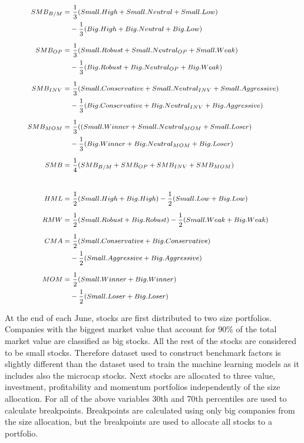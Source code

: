 \documentclass[12pt]{article}
\begin{document}
\begin{equation} \label{eq:FF6factors}
\footnotesize
\begin{split}
SMB_{B/M} = & \ \frac{1}{3} (Small.High + Small.Neutral + Small.Low) \\
			& - \frac{1}{3} (Big.High + Big.Neutral + Big.Low) \\[5pt]
SMB_{OP} = & \ \frac{1}{3} (Small.Robust + Small.Neutral_{OP} + Small.Weak)\\
			& - \frac{1}{3} (Big.Robust + Big.Neutral_{OP} + Big.Weak)\\[5pt]
SMB_{INV} = & \ \frac{1}{3} (Small.Conservative + Small.Neutral_{INV} + Small.Aggressive)\\
			& - \frac{1}{3} (Big.Conservative + Big.Neutral_{INV} + Big.Aggressive)\\[5pt]
SMB_{MOM} = & \ \frac{1}{3} ((Small.Winner + Small.Neutral_{MOM} + Small.Loser)\\
		     	& - \frac{1}{3} (Big.Winner + Big.Neutral_{MOM} + Big.Loser)\\[5pt]
SMB = & \ \frac{1}{4} (SMB_{B/M} + SMB_{OP} + SMB_{INV} + SMB_{MOM})\\[20pt]
HML = & \ \frac{1}{2} (Small.High + Big.High) - \frac{1}{2} (Small.Low + Big.Low)\\[5pt]
RMW = & \ \frac{1}{2} (Small.Robust + Big.Robust) - \frac{1}{2} (Small.Weak + Big.Weak)\\[5pt]
CMA = & \ \frac{1}{2} (Small.Conservative + Big.Conservative)\\
		& - \frac{1}{2} (Small.Aggressive + Big.Aggressive)\\[5pt]
MOM = & \ \frac{1}{2} (Small.Winner + Big.Winner)\\
		& - \frac{1}{2} (Small.Loser + Big.Loser)\\
\end{split}
\end{equation}

At the end of each June, stocks are first distributed to two size portfolios. Companies with the biggest market value that account for $90\%$ of the total market value are classified as big stocks. All the rest of the stocks are considered to be small stocks.\footnotemark {} Therefore dataset used to construct benchmark factors is slightly different than the dataset used to train the machine learning models as it includes also the microcap stocks. Next stocks are allocated to three value, investment, profitability and momentum portfolios independently of the size allocation. For all of the above variables 30th and 70th percentiles are used to calculate breakpoints. Breakpoints are calculated using only big companies from the size allocation, but the breakpoints are used to allocate all stocks to a portfolio. \par
\end{document}
